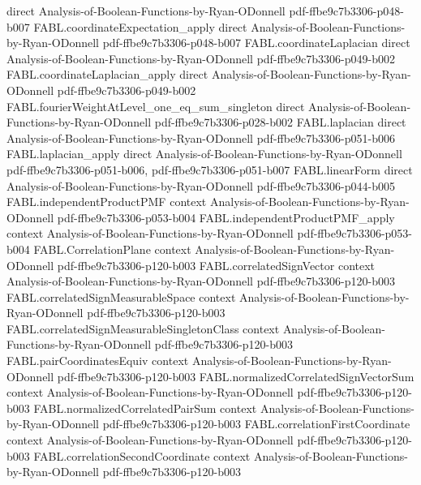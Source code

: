 \begin{theorem}
  {direct}
  {Analysis-of-Boolean-Functions-by-Ryan-ODonnell}
  {pdf-ffbe9c7b3306-p048-b007}
\proofstep
  {FABL.coordinateExpectation_apply}
  {direct}
  {Analysis-of-Boolean-Functions-by-Ryan-ODonnell}
  {pdf-ffbe9c7b3306-p048-b007}
\proofstep
  {FABL.coordinateLaplacian}
  {direct}
  {Analysis-of-Boolean-Functions-by-Ryan-ODonnell}
  {pdf-ffbe9c7b3306-p049-b002}
\proofstep
  {FABL.coordinateLaplacian_apply}
  {direct}
  {Analysis-of-Boolean-Functions-by-Ryan-ODonnell}
  {pdf-ffbe9c7b3306-p049-b002}
\proofstep
  {FABL.fourierWeightAtLevel_one_eq_sum_singleton}
  {direct}
  {Analysis-of-Boolean-Functions-by-Ryan-ODonnell}
  {pdf-ffbe9c7b3306-p028-b002}
\proofstep
  {FABL.laplacian}
  {direct}
  {Analysis-of-Boolean-Functions-by-Ryan-ODonnell}
  {pdf-ffbe9c7b3306-p051-b006}
\proofstep
  {FABL.laplacian_apply}
  {direct}
  {Analysis-of-Boolean-Functions-by-Ryan-ODonnell}
  {pdf-ffbe9c7b3306-p051-b006,
    pdf-ffbe9c7b3306-p051-b007}
\proofstep
  {FABL.linearForm}
  {direct}
  {Analysis-of-Boolean-Functions-by-Ryan-ODonnell}
  {pdf-ffbe9c7b3306-p044-b005}
\proofstep
  {FABL.independentProductPMF}
  {context}
  {Analysis-of-Boolean-Functions-by-Ryan-ODonnell}
  {pdf-ffbe9c7b3306-p053-b004}
\proofstep
  {FABL.independentProductPMF_apply}
  {context}
  {Analysis-of-Boolean-Functions-by-Ryan-ODonnell}
  {pdf-ffbe9c7b3306-p053-b004}
\proofstep
  {FABL.CorrelationPlane}
  {context}
  {Analysis-of-Boolean-Functions-by-Ryan-ODonnell}
  {pdf-ffbe9c7b3306-p120-b003}
\proofstep
  {FABL.correlatedSignVector}
  {context}
  {Analysis-of-Boolean-Functions-by-Ryan-ODonnell}
  {pdf-ffbe9c7b3306-p120-b003}
\proofstep
  {FABL.correlatedSignMeasurableSpace}
  {context}
  {Analysis-of-Boolean-Functions-by-Ryan-ODonnell}
  {pdf-ffbe9c7b3306-p120-b003}
\proofstep
  {FABL.correlatedSignMeasurableSingletonClass}
  {context}
  {Analysis-of-Boolean-Functions-by-Ryan-ODonnell}
  {pdf-ffbe9c7b3306-p120-b003}
\proofstep
  {FABL.pairCoordinatesEquiv}
  {context}
  {Analysis-of-Boolean-Functions-by-Ryan-ODonnell}
  {pdf-ffbe9c7b3306-p120-b003}
\proofstep
  {FABL.normalizedCorrelatedSignVectorSum}
  {context}
  {Analysis-of-Boolean-Functions-by-Ryan-ODonnell}
  {pdf-ffbe9c7b3306-p120-b003}
\proofstep
  {FABL.normalizedCorrelatedPairSum}
  {context}
  {Analysis-of-Boolean-Functions-by-Ryan-ODonnell}
  {pdf-ffbe9c7b3306-p120-b003}
\proofstep
  {FABL.correlationFirstCoordinate}
  {context}
  {Analysis-of-Boolean-Functions-by-Ryan-ODonnell}
  {pdf-ffbe9c7b3306-p120-b003}
\proofstep
  {FABL.correlationSecondCoordinate}
  {context}
  {Analysis-of-Boolean-Functions-by-Ryan-ODonnell}
  {pdf-ffbe9c7b3306-p120-b003}

\end{theorem}
